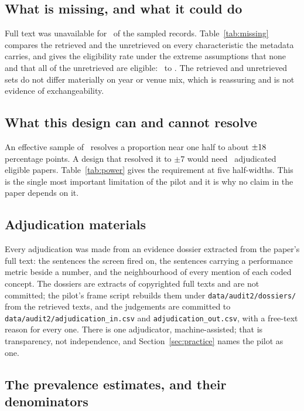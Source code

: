 \subsection*{What is missing, and what it could do}



Full text was unavailable for \nAuditNoFullText\ of the sampled records.
Table~\ref{tab:missing} compares the retrieved and the unretrieved on every
characteristic the metadata carries, and gives the eligibility rate under the
extreme assumptions that none and that all of the unretrieved are eligible:
\auditBoundLo\ to \auditBoundHi. The retrieved and unretrieved sets do not
differ materially on year or venue mix, which is reassuring and is not
evidence of exchangeability.

\subsection*{What this design can and cannot resolve}



An effective sample of \nAuditEffective\ resolves a proportion near one half
to about $\pm18$ percentage points. A design that resolved it
to $\pm 7$ would need \nAuditRequired\ adjudicated eligible papers.
Table~\ref{tab:power} gives the requirement at five half-widths. This is the
single most important limitation of the pilot and it is why no claim in the
paper depends on it.

\subsection*{Adjudication materials}

Every adjudication was made from an evidence dossier extracted from the paper's
full text: the sentences the screen fired on, the sentences carrying a
performance metric beside a number, and the neighbourhood of every mention of
each coded concept. The dossiers are extracts of copyrighted full texts and
are not committed; the pilot's frame script rebuilds them under
\texttt{data/audit2/dossiers/} from the retrieved texts, and the judgements
are committed to \texttt{data/audit2/adjudication\_in.csv} and
\texttt{adjudication\_out.csv}, with a free-text reason for every one. There
is one adjudicator, machine-assisted; that is transparency, not independence,
and Section~\ref{sec:practice} names the pilot as one.

\subsection*{The prevalence estimates, and their denominators}

